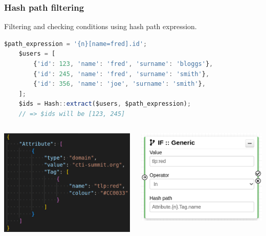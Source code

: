\begin{frame}[fragile]
    \frametitle{Hash path filtering}
    Filtering and checking conditions using hash path expression.
    \begin{lstlisting}[language=javascript,firstnumber=1]
    $path_expression = '{n}[name=fred].id';
    $users = [
        {'id': 123, 'name': 'fred', 'surname': 'bloggs'},
        {'id': 245, 'name': 'fred', 'surname': 'smith'},
        {'id': 356, 'name': 'joe', 'surname': 'smith'},
    ];
    $ids = Hash::extract($users, $path_expression);
    // => $ids will be [123, 245]
    \end{lstlisting}
    \begin{columns}
        \begin{column}{0.6\textwidth}
            \begin{center}
                \includegraphics[width=0.7\linewidth]{pictures/attribute-json.png}
            \end{center}
        \end{column}
        \begin{column}{0.4\textwidth}
            \includegraphics[width=1.0\linewidth]{pictures/module-if-generic.png}
        \end{column}
    \end{columns}
\end{frame}

